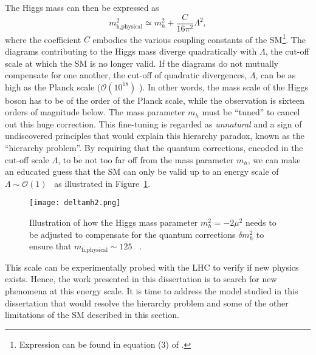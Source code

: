 The Higgs mass can then be expressed as
\begin{equation}
 m_\text{h,physical}^2 \simeq m_h^2 + \frac{C}{16\pi^2}\Lambda^2,
\end{equation}
where the coefficient $C$ embodies the various coupling constants of the SM\footnote{Expression can be found in equation (3) of \cite{Baer:2015fsa}.}.
The diagrams contributing to the Higgs mass diverge quadratically with $\Lambda$, the cut-off scale at which the SM is no longer valid.
If the diagrams do not mutually compensate for one another, the cut-off of quadratic divergences, $\Lambda$, can be as high as the Planck scale ($\mathcal{O}\left(10^{18}\right)$ \GeV).
In other words, the mass scale of the Higgs boson has to be of the order of the Planck scale, while the observation is sixteen orders of magnitude below.
The mass parameter $m_h$ must be ``tuned'' to cancel out this huge correction.
This fine-tuning is regarded as \textit{unnatural} and a sign of undiscovered principles that would explain this hierarchy paradox, known as the ``hierarchy problem''.
By requiring that the quantum corrections, encoded in the cut-off scale $\Lambda$, to be not too far off from the mass parameter $m_h$, we can make an educated 
guess that the SM can only be valid up to an energy scale of $\Lambda \sim \mathcal{O}\left(1\right)$ \TeV~as illustrated in Figure~\ref{fig:theory.sm.deltamh2}.
\begin{figure}[htb!]
\centering
\texttt{[image: deltamh2.png]}
\caption{Illustration of how the Higgs mass parameter $m_h^2 = -2\mu^2$ needs to be adjusted to compensate for the quantum corrections $\delta m_h^2$ to ensure 
that $m_\text{h,physical} \sim 125$ \GeV~\cite{Bae:2015jea}.}
\label{fig:theory.sm.deltamh2}
\end{figure} 
This scale can be experimentally probed with the LHC to verify if new physics exists. Hence, the work presented in this dissertation is to search for new phenomena 
at this energy scale.
It is time to address the model studied in this dissertation that would resolve the hierarchy problem and some of the other limitations of the SM described in this section.

